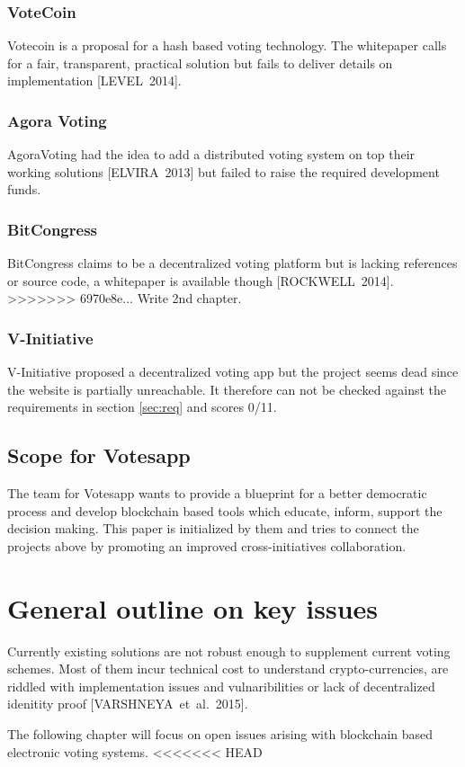 \documentclass[9pt,oneside]{amsart}
\begin{document}
\begin{multicols}{2}
\subsubsection{VoteCoin}
Votecoin is a proposal for a hash based voting technology. The whitepaper calls for a fair, transparent, practical solution but fails to deliver details on implementation [LEVEL~2014].

\subsubsection{Agora Voting}
AgoraVoting had the idea to add a distributed voting system on top their working solutions [ELVIRA~2013] but failed to raise the required development funds.

\subsubsection{BitCongress}
BitCongress claims to be a decentralized voting platform but is lacking references or source code, a whitepaper is available though [ROCKWELL~2014].
>>>>>>> 6970e8e... Write 2nd chapter.

\subsubsection{V-Initiative}
V-Initiative proposed a decentralized voting app but the project seems dead since the website is partially unreachable. It therefore can not be checked against the requirements in section \ref{sec:req} and scores 0/11.

\subsection{Scope for Votesapp}
The team for Votesapp wants to provide a blueprint for a better democratic process and develop blockchain based tools which educate, inform, support the decision making. This paper is initialized by them and tries to connect the projects above by promoting an improved cross-initiatives collaboration.

\section{General outline on key issues}
Currently existing solutions are not robust enough to supplement current voting schemes. Most of them incur technical cost to understand crypto-currencies, are riddled with implementation issues and vulnaribilities or lack of decentralized idenitity proof [VARSHNEYA~et~al.~2015].\par
The following chapter will focus on open issues arising with blockchain based electronic voting systems.
<<<<<<< HEAD


\end{multicols}
\end{document}
